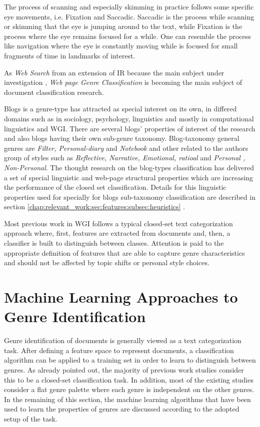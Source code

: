 The process of scanning and especially skimming in practice follows some specific eye movements, i.e. Fixation and Saccadic. Saccadic is the process while scanning or skimming that the eye is jumping around to the text, while Fixation is the process where the eye remains focused for a while. One can resemble the process like navigation where the eye is constantly moving while is focused for small fragments of time in landmarks of interest.
  
As \textit{Web Search} from an extension of IR because the main subject under investigation \parencite{manning2008introduction}, \textit{Web page Genre Classification } is becoming the main subject of document classification research.

Blogs is a genre-type has attracted as special interest on its own, in differed domains such as in sociology, psychology, linguistics and mostly in computational linguistics and WGI. There are several blogs' properties of interest of the research and  also blogs having their own sub-genre taxonomy. Blog-taxonomy general genres are \textit{Filter, Personal-diary} and \textit{Notebook} and other related to the authors group of styles such as \textit{Reflective, Narrative, Emotional, ratioal} and \textit{Personal , Non-Personal}. The thought research on the blog-types classification has delivered a set of special linguistic and web-page structural properties which are increasing the performance of the closed set classification. Details for this linguistic properties used for specially for blogs sub-taxonomy classification are described in section \ref{chap:relevant_work:sec:features:subsec:heuristics} \parencite{virik2017blog,hoffmann2012cohesive,hoffmann2012cohesive,derczynski2014social,qu2006automated}. 

Most previous work in WGI follows a typical closed-set text categorization approach where, first, features are extracted from documents and, then, a classifier is built to distinguish between classes. Attention is paid to the appropriate definition of features that are able to capture genre characteristics and should not be affected by topic shifts or personal style choices. 

\section{Machine Learning Approaches to Genre Identification}
\label{chap:relevant_work:sec:machine_learning_methods}

Genre identification of documents is generally viewed as a text categorization task. After defining a feature space to represent documents, a classification algorithm can be applied to a training set in order to learn to distinguish between genres. As already pointed out, the majority of previous work studies consider this to be a closed-set classification task. In addition, most of the existing studies consider a flat genre palette where each genre is independent on the other genres. In the remaining of this section, the machine learning algorithms that have been used to learn the properties of genres are discussed according to the adopted setup of the task. 

